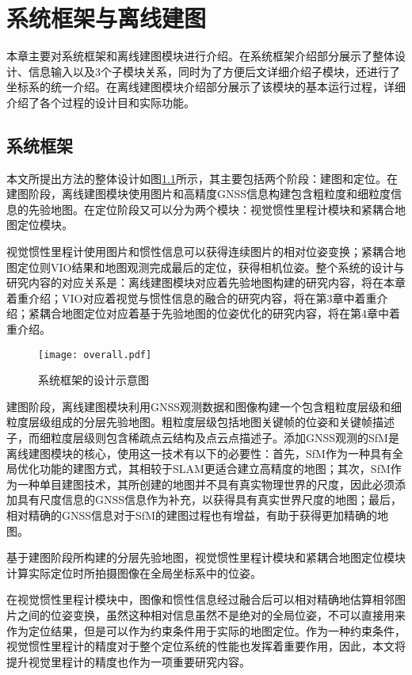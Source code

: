 
\chapter{系统框架与离线建图}

本章主要对系统框架和离线建图模块进行介绍。在系统框架介绍部分展示了整体设计、信息输入以及3个子模块关系，同时为了方便后文详细介绍子模块，还进行了坐标系的统一介绍。在离线建图模块介绍部分展示了该模块的基本运行过程，详细介绍了各个过程的设计目和实际功能。

\section{系统框架}

本文所提出方法的整体设计如图\ref{fig:overall}所示，其主要包括两个阶段：建图和定位。在建图阶段，离线建图模块使用图片和高精度GNSS信息构建包含粗粒度和细粒度信息的先验地图。在定位阶段又可以分为两个模块：视觉惯性里程计模块和紧耦合地图定位模块。

视觉惯性里程计使用图片和惯性信息可以获得连续图片的相对位姿变换；紧耦合地图定位则VIO结果和地图观测完成最后的定位，获得相机位姿。整个系统的设计与研究内容的对应关系是：离线建图模块对应着先验地图构建的研究内容，将在本章着重介绍；VIO对应着视觉与惯性信息的融合的研究内容，将在第3章中着重介绍；紧耦合地图定位对应着基于先验地图的位姿优化的研究内容，将在第4章中着重介绍。

\begin{figure}
  \centering
  \texttt{[image: overall.pdf]}
  \caption{系统框架的设计示意图}
  \label{fig:overall}
\end{figure}

建图阶段，离线建图模块利用GNSS观测数据和图像构建一个包含粗粒度层级和细粒度层级组成的分层先验地图。粗粒度层级包括地图关键帧的位姿和关键帧描述子，而细粒度层级则包含稀疏点云结构及点云点描述子。添加GNSS观测的SfM是离线建图模块的核心，使用这一技术有以下的必要性：首先，SfM作为一种具有全局优化功能的建图方式，其相较于SLAM更适合建立高精度的地图；其次，SfM作为一种单目建图技术，其所创建的地图并不具有真实物理世界的尺度，因此必须添加具有尺度信息的GNSS信息作为补充，以获得具有真实世界尺度的地图；最后，相对精确的GNSS信息对于SfM的建图过程也有增益，有助于获得更加精确的地图。

基于建图阶段所构建的分层先验地图，视觉惯性里程计模块和紧耦合地图定位模块计算实际定位时所拍摄图像在全局坐标系中的位姿。

在视觉惯性里程计模块中，图像和惯性信息经过融合后可以相对精确地估算相邻图片之间的位姿变换，虽然这种相对信息虽然不是绝对的全局位姿，不可以直接用来作为定位结果，但是可以作为约束条件用于实际的地图定位。作为一种约束条件，视觉惯性里程计的精度对于整个定位系统的性能也发挥着重要作用，因此，本文将提升视觉里程计的精度也作为一项重要研究内容。

